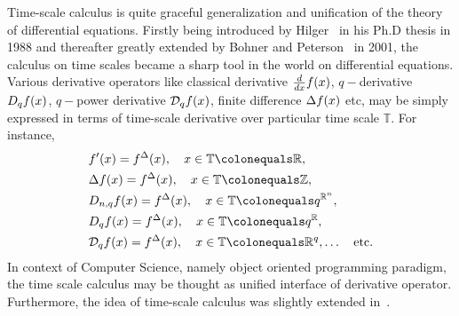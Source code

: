 Time-scale calculus is quite graceful generalization and unification of the theory of differential equations.
Firstly being introduced by Hilger~\cite{hilger1988ein} in his Ph.D thesis in 1988 and thereafter greatly
extended by Bohner and Peterson~\cite{Bohner2001DynamicEO} in 2001, the calculus on time scales became a sharp tool
in the world on differential equations.
Various derivative operators like classical derivative $\derivative{f(x)}{x}$, $q-$derivative $\qderivative{f(x)}$,
$q-$power derivative $\qpowerDerivative{f(x)}$, finite difference $\finiteDifference{f(x)}$ etc,
may be simply expressed in terms of time-scale derivative over particular time scale $\mathbb{T}$.
For instance,
\begin{align*}
    &f^\prime (x) = f^{\Delta} (x), \quad x\in\mathbb{T} \colonequals \mathbb{R}, \\
    &\Delta f(x) = f^{\Delta} (x), \quad x\in\mathbb{T} \colonequals \mathbb{Z}, \\
    &\nqderivative{f(x)} = f^{\Delta} (x), \quad x\in\mathbb{T} \colonequals q^{\mathbb{R}^n}, \\
    &\qderivative{f(x)} = f^{\Delta} (x), \quad x\in\mathbb{T} \colonequals q^\mathbb{R}, \\
    &\qpowerDerivative{f(x)} = f^{\Delta} (x), \quad x\in\mathbb{T} \colonequals \mathbb{R}^q, \dots \quad \mathrm{etc.}
\end{align*}
In context of Computer Science, namely object oriented programming paradigm, the time scale calculus may be thought
as unified interface of derivative operator.
Furthermore, the idea of time-scale calculus was slightly extended
in~\cite{bayour2017truly,benkhettou2016conformable,caputo2009time,martins2009calculus}.